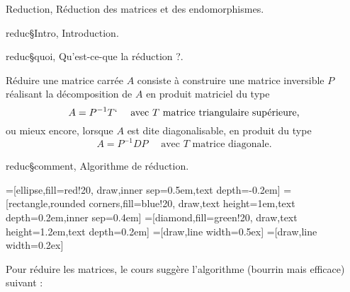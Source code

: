 \Chapter Reduction, Réduction des matrices et des endomorphismes. 

\Section reduc§Intro, Introduction. 

\Subsection reduc§quoi, Qu'est-ce-que la réduction ?. 

Réduire une matrice carrée $A$ consiste à construire une matrice inversible $P$ réalisant la décomposition de $A$ en produit matriciel du type
\Equation [\bf Trigonalisation de $A$]
$$
A=P^{-1}T`\quad \mbox{ avec $T$ matrice triangulaire supérieure,}
$$
ou mieux encore, lorsque $A$ est dite diagonalisable, en produit du type
\Equation [\bf Diagonalisation de $A$] 
$$
A=P^{-1}DP\quad \mbox{ avec $T$ matrice diagonale.}
$$

\Subsection reduc§comment, Algorithme de réduction.

=[ellipse,fill=red!20, draw,inner sep=0.5em,text depth=-0.2em]
=[rectangle,rounded corners,fill=blue!20, draw,text height=1em,text depth=0.2em,inner sep=0.4em]
=[diamond,fill=green!20, draw,text height=1.2em,text depth=0.2em]
=[draw,line width=0.5ex]
=[draw,line width=0.2ex]

Pour réduire les matrices, le cours suggère l'algorithme (bourrin mais efficace) suivant : 


